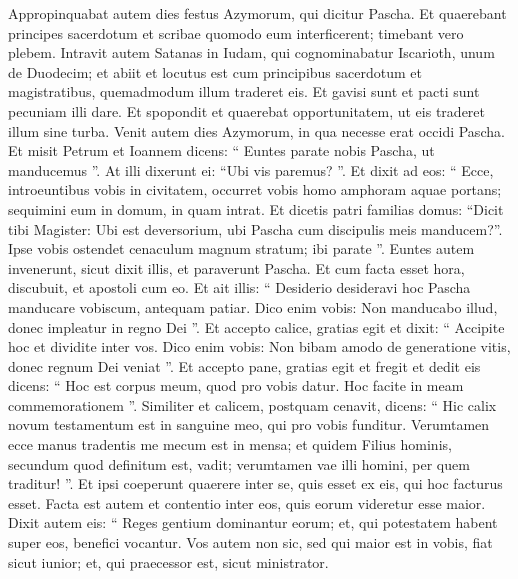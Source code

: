 \begin{biblechapter}
\begin{biblechapter}
\begin{biblechapter}
\begin{biblechapter}
\begin{biblechapter}
\begin{biblechapter}
\begin{biblechapter}
\begin{biblechapter}
\begin{biblechapter}
\begin{biblechapter}
\begin{biblechapter}
\begin{biblechapter}
\begin{biblechapter}
\begin{biblechapter}
\begin{biblechapter}
\begin{biblechapter}
\begin{biblechapter}
\begin{biblechapter}
\begin{biblechapter}
\begin{biblechapter}
\begin{biblechapter}
\begin{biblechapter}
\verse Appropinquabat autem dies festus Azymorum, qui dicitur Pascha. 
\verse Et quaerebant principes sacerdotum et scribae quomodo eum interficerent; timebant vero plebem. 
\verse Intravit autem Satanas in Iudam, qui cognominabatur Iscarioth, unum de Duodecim; 
\verse et abiit et locutus est cum principibus sacerdotum et magistratibus, quemadmodum illum traderet eis. 
\verse Et gavisi sunt et pacti sunt pecuniam illi dare. 
\verse Et spopondit et quaerebat opportunitatem, ut eis traderet illum sine turba.
 \verse Venit autem dies Azymorum, in qua necesse erat occidi Pascha. 
\verse Et misit Petrum et Ioannem dicens: “ Euntes parate nobis Pascha, ut manducemus ”. 
\verse At illi dixerunt ei: “Ubi vis paremus? ”. 
\verse Et dixit ad eos: “ Ecce, introeuntibus vobis in civitatem, occurret vobis homo amphoram aquae portans; sequimini eum in domum, in quam intrat. 
\verse Et dicetis patri familias domus: “Dicit tibi Magister: Ubi est deversorium, ubi Pascha cum discipulis meis manducem?”. 
\verse Ipse vobis ostendet cenaculum magnum stratum; ibi parate ”. 
\verse Euntes autem invenerunt, sicut dixit illis, et paraverunt Pascha.
 \verse Et cum facta esset hora, discubuit, et apostoli cum eo. 
\verse Et ait illis: “ Desiderio desideravi hoc Pascha manducare vobiscum, antequam patiar. 
\verse Dico enim vobis: Non manducabo illud, donec impleatur in regno Dei ”. 
\verse Et accepto calice, gratias egit et dixit: “ Accipite hoc et dividite inter vos. 
 \verse Dico enim vobis: Non bibam amodo de generatione vitis, donec regnum Dei veniat ”. 
\verse Et accepto pane, gratias egit et fregit et dedit eis dicens: “ Hoc est corpus meum, quod pro vobis datur. Hoc facite in meam commemorationem ”. 
\verse Similiter et calicem, postquam cenavit, dicens: “ Hic calix novum testamentum est in sanguine meo, qui pro vobis funditur.
 \verse Verumtamen ecce manus tradentis me mecum est in mensa; 
\verse et quidem Filius hominis, secundum quod definitum est, vadit; verumtamen vae illi homini, per quem traditur! ”. 
\verse Et ipsi coeperunt quaerere inter se, quis esset ex eis, qui hoc facturus esset.
 \verse Facta est autem et contentio inter eos, quis eorum videretur esse maior. 
 \verse Dixit autem eis: “ Reges gentium dominantur eorum; et, qui potestatem habent super eos, benefici vocantur. 
\verse Vos autem non sic, sed qui maior est in vobis, fiat sicut iunior; et, qui praecessor est, sicut ministrator. 

\end{biblechapter}
\end{biblechapter}
\end{biblechapter}
\end{biblechapter}
\end{biblechapter}
\end{biblechapter}
\end{biblechapter}
\end{biblechapter}
\end{biblechapter}
\end{biblechapter}
\end{biblechapter}
\end{biblechapter}
\end{biblechapter}
\end{biblechapter}
\end{biblechapter}
\end{biblechapter}
\end{biblechapter}
\end{biblechapter}
\end{biblechapter}
\end{biblechapter}
\end{biblechapter}
\end{biblechapter}
